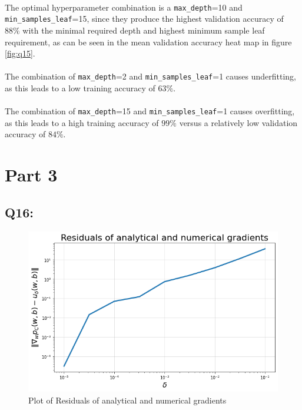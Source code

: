 \documentclass{article}
\newcommand{\code}[1]{\texttt{#1}}
\begin{document}
    \paragraph*{}
    The optimal hyperparameter combination is a \code{max\_depth}=10 and \code{min\_samples\_leaf}=15, since they produce the highest validation accuracy of $88\%$ with the minimal required depth and highest minimum sample leaf requirement, as can be seen in the mean validation accuracy heat map in figure \ref{fig:q15}.
    \paragraph*{}
    The combination of \code{max\_depth}=2 and \code{min\_samples\_leaf}=1 causes underfitting, as this leads to a low training accuracy of $63\%$.
    \paragraph*{}
    The combination of \code{max\_depth}=15 and \code{min\_samples\_leaf}=1 causes overfitting, as this leads to a high training accuracy of $99\%$ versus a relatively low validation accuracy of $84\%$.
\section*{Part 3}
\subsection*{Q16:}
    \begin{figure}[H]
        \centering
        \includegraphics[scale=0.48]{q16.png}
        \caption{Plot of Residuals of analytical and numerical gradients}
        \label{fig:q16}
    \end{figure}
\end{document}
